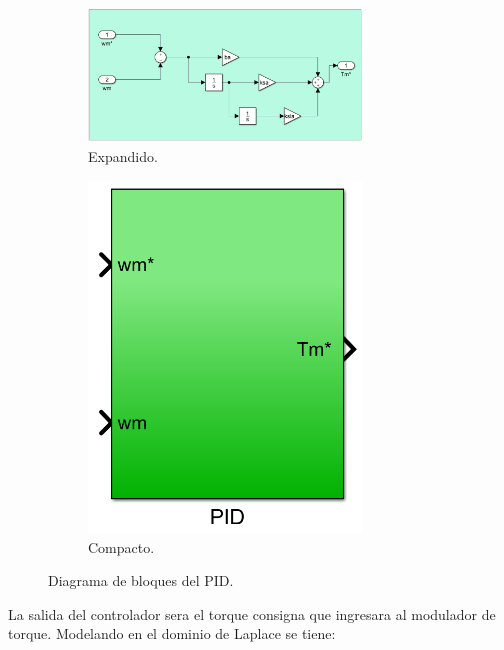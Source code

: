 \documentclass{article}
\begin{document}
\begin{figure}[H]
    \begin{subfigure}[b]{0.75\textwidth}
        \centering
        \includegraphics[width=0.8\textwidth]{pid.png}
        \caption{Expandido.}
    \end{subfigure}
    \begin{subfigure}[b]{0.24\textwidth}
        \centering
        \includegraphics[width=0.8\textwidth]{pid_compacto.png}
        \caption{Compacto.}
    \end{subfigure}
    \caption{Diagrama de bloques del PID.}
\end{figure}

La salida del controlador sera el torque consigna que ingresara al modulador de torque. Modelando en el 
dominio de Laplace se tiene:
\end{document}
